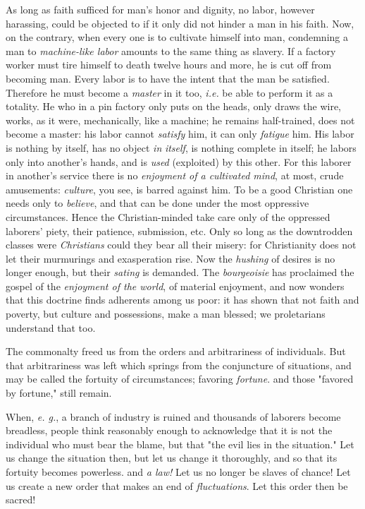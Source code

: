 \documentclass[a4paper]{book}
\begin{document}
As long as faith sufficed for man's honor and dignity, no labor, however 
harassing, could be objected to if it only did not hinder a man in his faith. 
Now, on the contrary, when every one is to cultivate himself into man, 
condemning a man to \textit{machine-like labor} amounts to the same thing as 
slavery. If a factory worker must tire himself to death twelve hours and more, 
he is cut off from becoming man. Every labor is to have the intent that the 
man be satisfied. Therefore he must become a \textit{master} in it too, 
\textit{i.e.} be able to perform it as a totality. He who in a pin factory 
only puts on the heads, only draws the wire, works, as it were, mechanically, 
like a machine; he remains half-trained, does not become a master: his labor 
cannot \textit{satisfy} him, it can only \textit{fatigue} him. His labor is 
nothing by itself, has no object \textit{in} \textit{itself}, is nothing 
complete in itself; he labors only into another's hands, and is \textit{used} 
(exploited) by this other. For this laborer in another's service there is no 
\textit{enjoyment of a cultivated mind}, at most, crude amusements: 
\textit{culture}, you see, is barred against him. To be a good Christian one 
needs only to \textit{believe}, and that can be done under the most oppressive 
circumstances. Hence the Christian-minded take care only of the oppressed 
laborers' piety, their patience, submission, etc. Only so long as the 
downtrodden classes were \textit{Christians} could they bear all their misery: 
for Christianity does not let their murmurings and exasperation rise. Now the 
\textit{hushing} of desires is no longer enough, but their \textit{sating} is 
demanded. The \textit{bourgeoisie} has proclaimed the gospel of the 
\textit{enjoyment of the world}, of material enjoyment, and now wonders that 
this doctrine finds adherents among us poor: it has shown that not faith and 
poverty, but culture and possessions, make a man blessed; we proletarians 
understand that too.

The commonalty freed us from the orders and arbitrariness of individuals. But 
that arbitrariness was left which springs from the conjuncture of situations, 
and may be called the fortuity of circumstances; favoring \textit{fortune}. 
and those "{}favored by fortune,"{} still remain.

When, \textit{e. g.}, a branch of industry is ruined and thousands of laborers 
become breadless, people think reasonably enough to acknowledge that it is not 
the individual who must bear the blame, but that "{}the evil lies in the 
situation."{} Let us change the situation then, but let us change it 
thoroughly, and so that its fortuity becomes powerless. and \textit{a law!} 
Let us no longer be slaves of chance! Let us create a new order that makes an 
end of \textit{fluctuations}. Let this order then be sacred!
\end{document}
